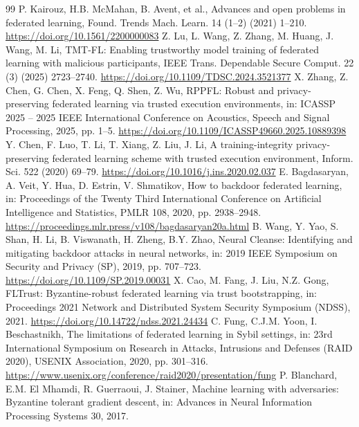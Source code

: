 \documentclass[11pt, a4paper]{article}
\begin{document}
\begin{thebibliography}{99}
     P. Kairouz, H.B. McMahan, B. Avent, et al., Advances and open problems in federated learning, Found. Trends Mach. Learn. 14 (1--2) (2021) 1--210. \url{https://doi.org/10.1561/2200000083}
     Z. Lu, L. Wang, Z. Zhang, M. Huang, J. Wang, M. Li, TMT-FL: Enabling trustworthy model training of federated learning with malicious participants, IEEE Trans. Dependable Secure Comput. 22 (3) (2025) 2723--2740. \url{https://doi.org/10.1109/TDSC.2024.3521377}
     X. Zhang, Z. Chen, G. Chen, X. Feng, Q. Shen, Z. Wu, RPPFL: Robust and privacy-preserving federated learning via trusted execution environments, in: ICASSP 2025 -- 2025 IEEE International Conference on Acoustics, Speech and Signal Processing, 2025, pp. 1--5. \url{https://doi.org/10.1109/ICASSP49660.2025.10889398}
     Y. Chen, F. Luo, T. Li, T. Xiang, Z. Liu, J. Li, A training-integrity privacy-preserving federated learning scheme with trusted execution environment, Inform. Sci. 522 (2020) 69--79. \url{https://doi.org/10.1016/j.ins.2020.02.037}
     E. Bagdasaryan, A. Veit, Y. Hua, D. Estrin, V. Shmatikov, How to backdoor federated learning, in: Proceedings of the Twenty Third International Conference on Artificial Intelligence and Statistics, PMLR 108, 2020, pp. 2938--2948. \url{https://proceedings.mlr.press/v108/bagdasaryan20a.html}
     B. Wang, Y. Yao, S. Shan, H. Li, B. Viswanath, H. Zheng, B.Y. Zhao, Neural Cleanse: Identifying and mitigating backdoor attacks in neural networks, in: 2019 IEEE Symposium on Security and Privacy (SP), 2019, pp. 707--723. \url{https://doi.org/10.1109/SP.2019.00031}
     X. Cao, M. Fang, J. Liu, N.Z. Gong, FLTrust: Byzantine-robust federated learning via trust bootstrapping, in: Proceedings 2021 Network and Distributed System Security Symposium (NDSS), 2021. \url{https://doi.org/10.14722/ndss.2021.24434}
     C. Fung, C.J.M. Yoon, I. Beschastnikh, The limitations of federated learning in Sybil settings, in: 23rd International Symposium on Research in Attacks, Intrusions and Defenses (RAID 2020), USENIX Association, 2020, pp. 301--316. \url{https://www.usenix.org/conference/raid2020/presentation/fung}
     P. Blanchard, E.M. El Mhamdi, R. Guerraoui, J. Stainer, Machine learning with adversaries: Byzantine tolerant gradient descent, in: Advances in Neural Information Processing Systems 30, 2017.

\end{thebibliography}
\end{document}
